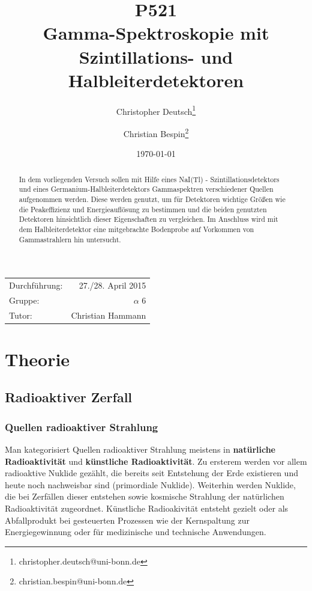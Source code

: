 \documentclass[11pt, a4paper]{article}
\title{P521 \\ Gamma-Spektroskopie mit Szintillations- und Halbleiterdetektoren}
\author{Christopher Deutsch\footnote{christopher.deutsch@uni-bonn.de} \and Christian Bespin\footnote{christian.bespin@uni-bonn.de}}
\date{\today}
\numberwithin{equation}{section}
\begin{document}
\begin{titlepage}

\maketitle

\begin{center}
\begin{tabular}{l r}
Durchführung: & 27./28. April 2015 \\
Gruppe: & $\alpha$ 6 \\
Tutor: & Christian Hammann
\end{tabular}
\end{center}

\begin{abstract}
\noindent In dem vorliegenden Versuch sollen mit Hilfe eines NaI(Tl) - Szintillationsdetektors und eines Germanium-Halbleiterdetektors Gammaspektren verschiedener Quellen aufgenommen werden.
Diese werden genutzt, um für Detektoren wichtige Größen wie die Peakeffizienz und Energieauflösung zu bestimmen und die beiden genutzten Detektoren hinsichtlich dieser Eigenschaften zu vergleichen. Im Anschluss wird mit dem Halbleiterdetektor eine mitgebrachte Bodenprobe auf Vorkommen von Gammastrahlern hin untersucht.
\end{abstract}

\end{titlepage}

\tableofcontents
\newpage

\section{Theorie}

\subsection{Radioaktiver Zerfall}

\subsubsection{Quellen radioaktiver Strahlung}
\label{sssec:quellen_radioaktivität}
Man kategorisiert Quellen radioaktiver Strahlung meistens in \textbf{natürliche Radioaktivität} und \textbf{künstliche Radioaktivität}.
Zu ersterem werden vor allem radioaktive Nuklide gezählt, die bereits seit Entstehung der Erde existieren und heute noch nachweisbar sind (primordiale Nuklide).
Weiterhin werden Nuklide, die bei Zerfällen dieser entstehen sowie kosmische Strahlung der natürlichen Radioaktivität zugeordnet.
Künstliche Radioakivität entsteht gezielt oder als Abfallprodukt bei gesteuerten Prozessen wie der Kernspaltung zur Energiegewinnung oder für medizinische und technische Anwendungen.
\end{document}
